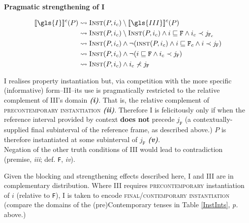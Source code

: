 \pex\textbf{Pragmatic strengthening of I}



\begin{align}
	\denote[c]{\gls{I}}(P)&\rightsquigarrow \textsc{Inst}(P,i_c)\setminus\denote[c]{\gls{III}}(P) \\
	&\rightsquigarrow \textsc{Inst}(P,i_c)\setminus \textsc{Inst}(P,i_c)\wedge i\sqsubseteq\mathtt{F}\wedge i_c\prec j_{\mathtt{F}_c}\\
	&\rightsquigarrow \textsc{Inst}(P,i_c)\wedge\neg(\textsc{inst}(P,i_c)\wedge i\sqsubseteq\texttt{F}_c\wedge i\prec j_{\texttt{F}})\\
	&\rightsquigarrow\textsc{Inst}(P,i_c)\wedge\neg(i\sqsubseteq\texttt{F}\wedge i_c\prec j_{\texttt{F}}) \\
	&\rightsquigarrow\textsc{Inst}(P,i_c)\wedge i_c\nprec j_{\texttt{F}}
\end{align}

\small\gls{I} realises property instantiation but, via competition with the more specific (informative) form--\gls{III}--its use is pragmatically restricted to the relative complement of \gls{III}'s domain \textbf{\textit{(i)}}. That is, the relative complement of \textsc{precontemporary instantiation} \textbf{\textit{(ii)}}. Therefore \gls{I} is felicitously only if when the reference interval provided by context \textbf{does not} precede $ j_{\texttt{F}} $ (a contextually-supplied final subinterval of the reference frame, as described above.) $ P $ is therefore instantiated at some subinterval of $ j_{\texttt{F}} $ \textbf{\textit{(v)}}.\\Negation of the other truth conditions of \gls{III} would lead to contradiction (premise, \textit{iii}; def. \texttt{F}, \textit{iv}).
\xe

Given the blocking and strengthening effects described here, \gls{I} and \gls{III} are in complementary distribution. Where \gls{III} requires \textsc{precontemporary} instantiation of $ i $ (relative to \texttt{F}), \gls{I} is taken to encode \textsc{final/contemporary instantiation} (compare the domains of the (pre)Contemporary tenses in Table \ref{InstInts}, \textit{p. \pageref{InstInts}} above.) 

